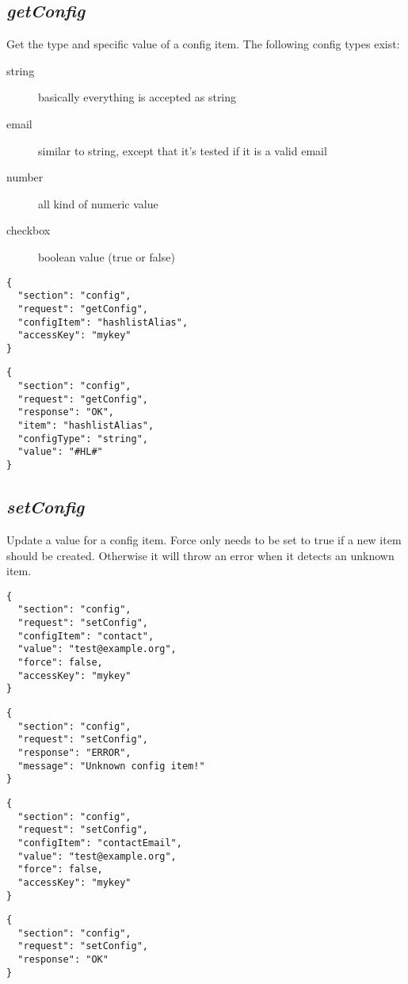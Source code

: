 \subsection*{\textit{getConfig}}
	Get the type and specific value of a config item. The following config types exist:
    \begin{description}
        \item[string] basically everything is accepted as string
        \item[email] similar to string, except that it's tested if it is a valid email
        \item[number] all kind of numeric value
        \item[checkbox] boolean value (true or false)
    \end{description}
	{
		\color{blue}
		\begin{verbatim}
{
  "section": "config",
  "request": "getConfig",
  "configItem": "hashlistAlias",
  "accessKey": "mykey"
}
		\end{verbatim}
	}
	{
		\color{OliveGreen}
		\begin{verbatim}
{
  "section": "config",
  "request": "getConfig",
  "response": "OK",
  "item": "hashlistAlias",
  "configType": "string",
  "value": "#HL#"
}
		\end{verbatim}
	}
\subsection*{\textit{setConfig}}
	Update a value for a config item. Force only needs to be set to true if a new item should be created. Otherwise it will throw an error when it detects an unknown item.
	{
		\color{blue}
		\begin{verbatim}
{
  "section": "config",
  "request": "setConfig",
  "configItem": "contact",
  "value": "test@example.org",
  "force": false,
  "accessKey": "mykey"
}
		\end{verbatim}
	}
	{
		\color{OliveGreen}
		\begin{verbatim}
{
  "section": "config",
  "request": "setConfig",
  "response": "ERROR",
  "message": "Unknown config item!"
}
		\end{verbatim}
	}
    {
        \color{blue}
        \begin{verbatim}
{
  "section": "config",
  "request": "setConfig",
  "configItem": "contactEmail",
  "value": "test@example.org",
  "force": false,
  "accessKey": "mykey"
}
        \end{verbatim}
    }
    {
        \color{OliveGreen}
        \begin{verbatim}
{
  "section": "config",
  "request": "setConfig",
  "response": "OK"
}
        \end{verbatim}
    }








